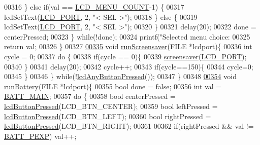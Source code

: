 \begin{DoxyCode}
00316         \} \textcolor{keywordflow}{else} \textcolor{keywordflow}{if}(val == \hyperlink{lcddiag_8h_af08e03edfc50fa6a3af2555f9cce6e6c}{LCD\_MENU\_COUNT}-1) \{
00317             lcdSetText(\hyperlink{lcdmsg_8h_abcf42bd88b3c36193f301ca25b033875}{LCD\_PORT}, 2, \textcolor{stringliteral}{"<      SEL     >"});
00318         \} \textcolor{keywordflow}{else} \{
00319             lcdSetText(\hyperlink{lcdmsg_8h_abcf42bd88b3c36193f301ca25b033875}{LCD\_PORT}, 2, \textcolor{stringliteral}{"<      SEL     >"});
00320         \}
00321         delay(20);
00322         done = centerPressed;
00323     \} \textcolor{keywordflow}{while}(!done);
00324     printf(\textcolor{stringliteral}{"Selected menu choice: %
00325     \textcolor{keywordflow}{return} val;
00326 \}
00327 
\hypertarget{lcddiag_8c_source.tex_l00335}{}\hyperlink{lcddiag_8c_a26920e40538bd7b86a0453f2629991d0}{00335} \textcolor{keywordtype}{void} \hyperlink{lcddiag_8c_a26920e40538bd7b86a0453f2629991d0}{runScreensaver}(FILE *lcdport)\{
00336     \textcolor{keywordtype}{int} cycle = 0;
00337     \textcolor{keywordflow}{do} \{
00338         \textcolor{keywordflow}{if}(cycle == 0)\{
00339             \hyperlink{lcdmsg_8c_acc19fe50b302412c894538965e77cb8b}{screensaver}(\hyperlink{lcdmsg_8h_abcf42bd88b3c36193f301ca25b033875}{LCD\_PORT});
00340         \}
00341         delay(20);
00342         cycle++;
00343         \textcolor{keywordflow}{if}(cycle==150)\{
00344             cycle=0;
00345         \}
00346     \} \textcolor{keywordflow}{while}(!\hyperlink{lcddiag_8h_a0592813f995bfeeadb9bee923833ed35}{lcdAnyButtonPressed}());
00347 \}
00348 
\hypertarget{lcddiag_8c_source.tex_l00354}{}\hyperlink{lcddiag_8c_a9a604d967527579e547780271290500f}{00354} \textcolor{keywordtype}{void} \hyperlink{lcddiag_8c_a9a604d967527579e547780271290500f}{runBattery}(FILE *lcdport)\{
00355     \textcolor{keywordtype}{bool} done = \textcolor{keyword}{false};
00356     \textcolor{keywordtype}{int} val = \hyperlink{sensors_8h_aa48831e4de90908c1b37560e7aba2c5f}{BATT\_MAIN};
00357     \textcolor{keywordflow}{do} \{
00358         \textcolor{keywordtype}{bool} centerPressed = \hyperlink{lcddiag_8h_a74e4c744db49f9b7b645095575e152ad}{lcdButtonPressed}(LCD\_BTN\_CENTER);
00359         \textcolor{keywordtype}{bool} leftPressed = \hyperlink{lcddiag_8h_a74e4c744db49f9b7b645095575e152ad}{lcdButtonPressed}(LCD\_BTN\_LEFT);
00360         \textcolor{keywordtype}{bool} rightPressed = \hyperlink{lcddiag_8h_a74e4c744db49f9b7b645095575e152ad}{lcdButtonPressed}(LCD\_BTN\_RIGHT);
00361 
00362         \textcolor{keywordflow}{if}(rightPressed && val != \hyperlink{sensors_8h_aaad063d8cfbd393cdc04bcaae68b48ef}{BATT\_PEXP}) val++;
}
\end{DoxyCode}
